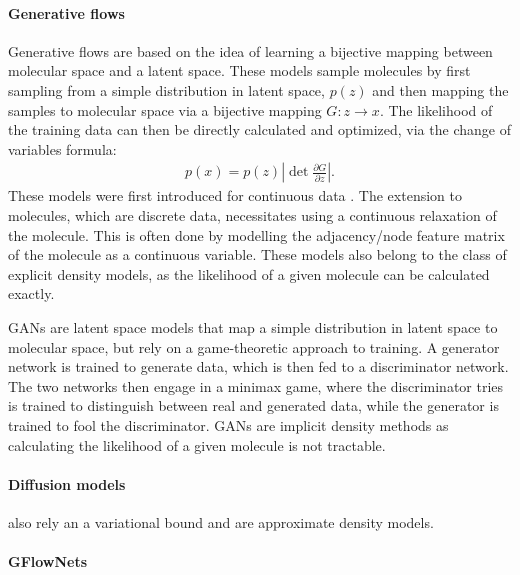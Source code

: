 \paragraph{Generative flows}
Generative flows are based on the idea of learning a bijective mapping between molecular space and a
latent space. These models sample molecules by first sampling from a simple distribution in latent
space, $p(z)$ and then mapping the samples to molecular space via a bijective mapping $G: z
      \rightarrow x$. The likelihood of the training data can then be directly calculated and optimized,
via the change of variables formula:
\begin{align}
      p(x) = p(z) \left| \det \frac{\partial G}{\partial z} \right|.
\end{align}
These models were first introduced for continuous data
\citet{rezendeVariationalInferenceNormalizing2016}. The extension to molecules, which are discrete
data, necessitates using a continuous relaxation of the molecule. This is often done by modelling
the adjacency/node feature matrix of the molecule as a continuous variable. These models also belong
to the class of explicit density models, as the likelihood of a given molecule can be calculated
exactly.

\Acp{GAN} are latent space models that map a simple distribution in latent space to molecular space,
but rely on a game-theoretic approach to training. A generator network is trained to
generate data, which is then fed to a discriminator network. The two networks then engage in a
minimax game, where the discriminator tries is trained to distinguish between real and generated
data, while the generator is trained to fool the discriminator. \acp{GAN} are implicit density
methods as calculating the likelihood of a given molecule is not tractable.

\paragraph{Diffusion models} also rely an a variational bound and are approximate density models.

\paragraph{GFlowNets}


